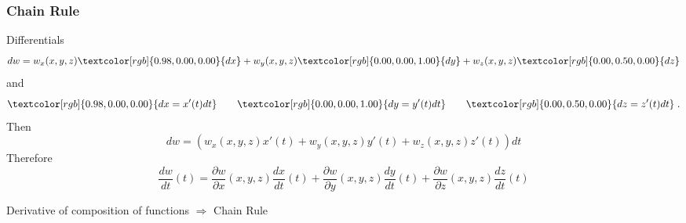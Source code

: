 \begin{frame}
  \frametitle{Chain Rule}
Differentials
%
$$dw=w_x(x,y,z)\textcolor[rgb]{0.98,0.00,0.00}{dx} +
w_y(x,y,z)\textcolor[rgb]{0.00,0.00,1.00}{dy}+
w_z(x,y,z)\textcolor[rgb]{0.00,0.50,0.00}{dz}$$
%
and
%
$$\textcolor[rgb]{0.98,0.00,0.00}{dx=x'(t)dt} \qquad
\textcolor[rgb]{0.00,0.00,1.00}{dy = y'(t)dt} \qquad
\textcolor[rgb]{0.00,0.50,0.00}{dz=z'(t)dt} \; .$$
%
\pause Then
%
$$dw = \left( w_x(x,y,z) x'(t) + w_y(x,y,z) y'(t) +
w_z(x,y,z) z'(t) \right) dt$$
%
\pause
Therefore
%
$$\frac{dw}{dt}(t) = \frac{\partial w}{\partial x}(x,y,z) \frac{dx}{dt}(t) +
\frac{\partial w}{\partial y}(x,y,z) \frac{dy}{dt}(t) +
\frac{\partial w}{\partial z}(x,y,z) \frac{dz}{dt}(t)$$

\pause
Derivative of composition of functions $\Longrightarrow$ \textcolor[rgb]{0.98,0.00,0.00}{Chain Rule}
\end{frame}